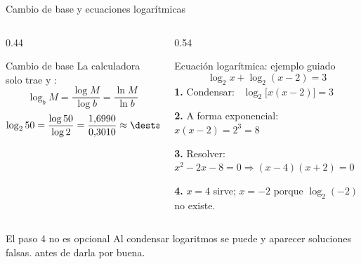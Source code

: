 \documentclass[aspectratio=169,10pt]{beamer}
\begin{document}
\begin{frame}{Cambio de base y ecuaciones logarítmicas}
  \scriptsize
  \begin{columns}[T,onlytextwidth]
    \begin{column}{0.44\textwidth}
      \begin{block}{Cambio de base}
        \tiny
        La calculadora solo trae  y :
        \[ \log_{b}M = \frac{\log M}{\log b} = \frac{\ln M}{\ln b} \]
        \[ \log_{2}50 = \frac{\log 50}{\log 2}
           = \frac{1{,}6990}{0{,}3010} \approx \destacar{5{,}64} \]
      \end{block}
    \end{column}
    \begin{column}{0.54\textwidth}
      \begin{exampleblock}{Ecuación logarítmica: ejemplo guiado}
        \tiny
        \[ \log_{2}x + \log_{2}(x-2) = 3 \]
        \textbf{1.} Condensar: \ $\log_{2}\big[x(x-2)\big] = 3$

        \textbf{2.} A forma exponencial: \ $x(x-2) = 2^{3} = 8$

        \textbf{3.} Resolver: \ $x^{2}-2x-8 = 0 \Rightarrow (x-4)(x+2)=0$

        \textbf{4.}  $x=4$ sirve;
        $x=-2$  porque $\log_2(-2)$ no existe.
      \end{exampleblock}
    \end{column}
  \end{columns}

  \vspace{0.08cm}
  \begin{alertblock}{El paso 4 no es opcional}
    \tiny
    Al condensar logaritmos se puede  y aparecer
    soluciones falsas.  antes de darla por buena.
  \end{alertblock}
\end{frame}
\end{document}
